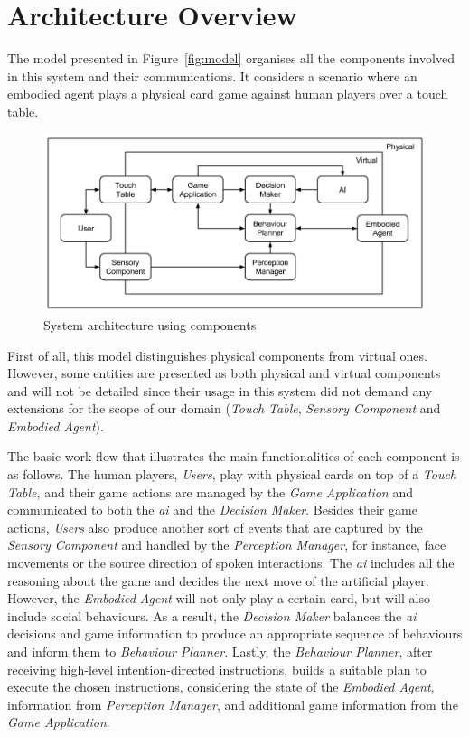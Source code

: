 \section{Architecture Overview}
\label{section:architecture-overview}

The model presented in Figure~\ref{fig:model} organises all the components involved in this system and their communications.
It considers a scenario where an embodied agent plays a physical card game against human players over a touch table.

\begin{figure}[ht]
  \centering
    \includegraphics[width=1\textwidth]{./img/6/architecture}
  \caption{System architecture using components}
\label{fig:architecture}
\end{figure}

First of all, this model distinguishes physical components from virtual ones.
However, some entities are presented as both physical and virtual components and will not be detailed since their usage in this system did not demand any extensions for the scope of our domain (\emph{Touch Table}, \emph{Sensory Component} and \emph{Embodied Agent}).

The basic work-flow that illustrates the main functionalities of each component is as follows.
The human players, \emph{Users}, play with physical cards on top of a \emph{Touch Table}, and their game actions are managed by the \emph{Game Application} and communicated to both the \emph{\ac{ai}} and the \emph{Decision Maker}.
Besides their game actions, \emph{Users} also produce another sort of events that are captured by the \emph{Sensory Component} and handled by the \emph{Perception Manager}, for instance, face movements or the source direction of spoken interactions.
The \emph{\ac{ai}} includes all the reasoning about the game and decides the next move of the artificial player.
However, the \emph{Embodied Agent} will not only play a certain card, but will also include social behaviours.
As a result, the \emph{Decision Maker} balances the \emph{\ac{ai}} decisions and game information to produce an appropriate sequence of behaviours and inform them to \emph{Behaviour Planner}.
Lastly, the \emph{Behaviour Planner}, after receiving high-level intention-directed instructions, builds a suitable plan to execute the chosen instructions, considering the state of the \emph{Embodied Agent}, information from \emph{Perception Manager}, and additional game information from the \emph{Game Application}.

